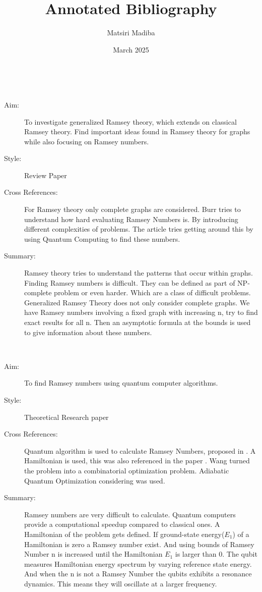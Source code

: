 \documentclass{Assignment}
\author{Matsiri Madiba}
\date{March 2025}
\title{Annotated Bibliography}
\begin{document}
\maketitle
\cite{burr1981generalized}~
\begin{description}
	\item[Aim:]
	To investigate generalized Ramsey theory, which extends on classical Ramsey theory.
	Find important ideas found in Ramsey theory for graphs while also focusing on Ramsey numbers.

\item[Style:]
Review Paper
\item[Cross References:]

For Ramsey theory only complete graphs are considered. 
Burr tries to understand how hard evaluating Ramsey Numbers is.
By introducing different complexities of problems.
The article \cite{PhysRevA.93.032301} tries getting around this by using Quantum Computing to find these numbers.
\item [Summary:]
Ramsey theory tries to understand the patterns that occur within graphs.
Finding Ramsey numbers is difficult.
They can be defined as part of NP-complete problem or even harder.
Which are a class of difficult problems.
Generalized Ramsey Theory does not only consider complete graphs.
We have Ramsey numbers involving a fixed graph with increasing n, try to find exact results for all n. 
Then an asymptotic formula at the bounds is used to give information about these numbers.  
\end{description}

\newpage
\cite{PhysRevA.93.032301}~
\begin{description}
	\item [Aim:]
	To find Ramsey numbers using quantum computer algorithms.
	\item [Style:]
	Theoretical Research paper
	\item [Cross References:]
	Quantum algorithm is used to calculate Ramsey Numbers, proposed in \cite{gaitan2012ramsey}.
	A Hamiltonian is used, this was also referenced in the paper \cite{doi:10.1137/S0097539796298637}.
	Wang turned the problem into a combinatorial optimization problem.
	Adiabatic Quantum Optimization considering \cite{farhi2000quantum} was used.
	
	\item [Summary:]
	Ramsey numbers are very difficult to calculate.
	Quantum computers provide a computational speedup compared to classical ones.
	A Hamiltonian of the problem gets defined.
	If ground-state energy($E_1$) of a Hamiltonian is zero a Ramsey number exist. 
	And using bounds of Ramsey Number n is increased until the Hamiltonian $E_1$ is larger than 0.
	The qubit measures Hamiltonian energy spectrum by varying reference state energy. 
	And when the n is not a Ramsey Number the qubits exhibits a resonance dynamics.
	This means they will oscillate at a larger frequency.
\end{description}
\end{document}
